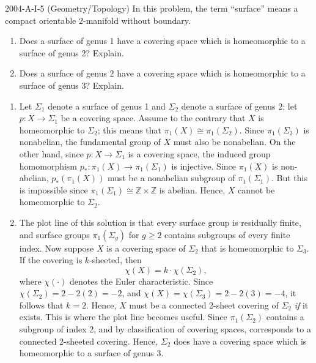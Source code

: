 \documentclass{article}
\begin{document}
\begin{prb}{2004-A-I-5 (Geometry/Topology)}
	In this problem, the term ``surface'' means a compact orientable 2-manifold without boundary. \vspace{-0.35cm}
		\begin{enumerate}[itemsep =-2pt,label = (\alph{*})]
			\item Does a surface of genus 1 have a covering space which is homeomorphic to a surface of genus 2? Explain. 
			\item Does a surface of genus 2 have a covering space which is homeomorphic to a surface of genus 3? Explain. 
		\end{enumerate}
\end{prb}
\begin{solutions}
	\vspace{-0.35cm}
	\begin{enumerate}[itemsep =-2pt,label = (\alph{*})]
		\item Let $\Sigma_{1}$ denote a surface of genus 1 and $\Sigma_{2}$ denote a surface of genus 2; let $p: X \to \Sigma_{1}$ be a covering space. Assume to the contrary that $X$ is homeomorphic to $\Sigma_{2}$; this means that $\pi_{1}(X) \cong \pi_{1}(\Sigma_{2})$. Since $\pi_{1}(\Sigma_{2})$ is nonabelian, the fundamental group of $X$ must also be nonabelian. On the other hand, since $p: X \to \Sigma_{1}$ is a covering space, the induced group homomorphism $p_{\ast}: \pi_{1}(X) \to \pi_{1}(\Sigma_{1})$ is injective. Since $\pi_{1}(X)$ is non-abelian, $p_{\ast}(\pi_{1}(X))$ must be a nonabelian subgroup of $\pi_{1}(\Sigma_{1})$. But this is impossible since $\pi_{1}(\Sigma_{1}) \cong \mathbb{Z} \times \mathbb{Z}$ is abelian. Hence, $X$ cannot be homeomorphic to $\Sigma_{2}$. 
		\item The plot line of this solution is that every surface group is residually finite, and surface groups $\pi_{1}(\Sigma_{g})$ for $g \geq 2$ contains subgroups of every finite index. Now suppose $X$ is a covering space of $\Sigma_{2}$ that is homeomorphic to $\Sigma_{3}$. If the covering is $k$-sheeted, then 
			\begin{equation}
				\chi(X) = k \cdot \chi(\Sigma_{2}), 
			\end{equation}
		where $\chi(\cdot)$ denotes the Euler characteristic. Since $\chi(\Sigma_{2}) = 2 - 2(2) = -2$, and $\chi(X) = \chi(\Sigma_{3}) = 2 - 2(3) = -4$, it follows that $k = 2$. Hence, $X$ must be a connected 2-sheet covering of $\Sigma_{2}$ \textit{if} it exists. This is where the plot line becomes useful. Since $\pi_{1}(\Sigma_{2})$ contains a subgroup of index 2, and by classification of covering spaces, corresponds to a connected 2-sheeted covering. Hence, $\Sigma_{2}$ does have a covering space which is homeomorphic to a surface of genus 3. 
	\end{enumerate}
\end{solutions} 
\end{document}
